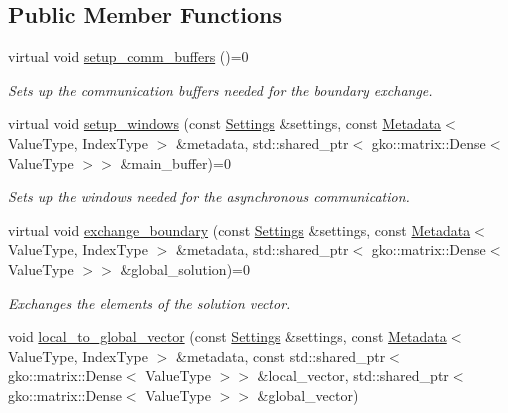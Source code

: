 \subsection*{Public Member Functions}
\begin{DoxyCompactItemize}
\item 
\mbox{\label{classschwz_1_1Communicate_ad77bbc19111a7b6ff79962d3a659a2cc}} 
virtual void \hyperlink{classschwz_1_1Communicate_ad77bbc19111a7b6ff79962d3a659a2cc}{setup\+\_\+comm\+\_\+buffers} ()=0
\begin{DoxyCompactList}\small\item\em Sets up the communication buffers needed for the boundary exchange. \end{DoxyCompactList}\item 
virtual void \hyperlink{classschwz_1_1Communicate_ab41e8e19e90ce2d53234cbec2cdb3b38}{setup\+\_\+windows} (const \hyperlink{structschwz_1_1Settings}{Settings} \&settings, const \hyperlink{structschwz_1_1Metadata}{Metadata}$<$ Value\+Type, Index\+Type $>$ \&metadata, std\+::shared\+\_\+ptr$<$ gko\+::matrix\+::\+Dense$<$ Value\+Type $>$$>$ \&main\+\_\+buffer)=0
\begin{DoxyCompactList}\small\item\em Sets up the windows needed for the asynchronous communication. \end{DoxyCompactList}\item 
virtual void \hyperlink{classschwz_1_1Communicate_a9f305bc37b86b1cf9369acdf6fe32f7d}{exchange\+\_\+boundary} (const \hyperlink{structschwz_1_1Settings}{Settings} \&settings, const \hyperlink{structschwz_1_1Metadata}{Metadata}$<$ Value\+Type, Index\+Type $>$ \&metadata, std\+::shared\+\_\+ptr$<$ gko\+::matrix\+::\+Dense$<$ Value\+Type $>$$>$ \&global\+\_\+solution)=0
\begin{DoxyCompactList}\small\item\em Exchanges the elements of the solution vector. \end{DoxyCompactList}\item 
void \hyperlink{classschwz_1_1Communicate_af951ced18d73fb0a8c81713fd87422fe}{local\+\_\+to\+\_\+global\+\_\+vector} (const \hyperlink{structschwz_1_1Settings}{Settings} \&settings, const \hyperlink{structschwz_1_1Metadata}{Metadata}$<$ Value\+Type, Index\+Type $>$ \&metadata, const std\+::shared\+\_\+ptr$<$ gko\+::matrix\+::\+Dense$<$ Value\+Type $>$$>$ \&local\+\_\+vector, std\+::shared\+\_\+ptr$<$ gko\+::matrix\+::\+Dense$<$ Value\+Type $>$$>$ \&global\+\_\+vector)

\end{DoxyCompactItemize}
